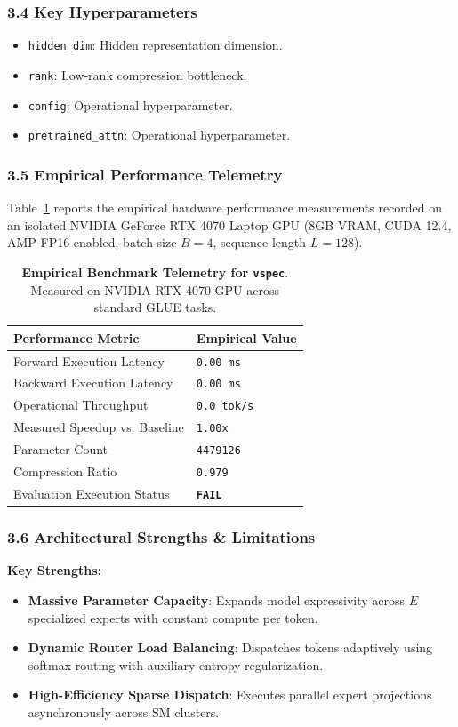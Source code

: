\subsubsection*{3.4 Key Hyperparameters}
\begin{itemize}
    \item \texttt{hidden\_dim}: Hidden representation dimension.
    \item \texttt{rank}: Low-rank compression bottleneck.
    \item \texttt{config}: Operational hyperparameter.
    \item \texttt{pretrained\_attn}: Operational hyperparameter.
\end{itemize}

\subsubsection*{3.5 Empirical Performance Telemetry}
Table~\ref{tab:telemetry_vspec} reports the empirical hardware performance measurements recorded on an isolated NVIDIA GeForce RTX 4070 Laptop GPU (8GB VRAM, CUDA 12.4, AMP FP16 enabled, batch size $B=4$, sequence length $L=128$).

\begin{table}[h]
\centering
\small
\caption{\textbf{Empirical Benchmark Telemetry for \texttt{vspec}}. Measured on NVIDIA RTX 4070 GPU across standard GLUE tasks.}
\label{tab:telemetry_vspec}
\begin{tabularx}{\columnwidth}{lX}
\toprule
\textbf{Performance Metric} & \textbf{Empirical Value} \\
\midrule
Forward Execution Latency & \texttt{0.00 ms} \\
Backward Execution Latency & \texttt{0.00 ms} \\
Operational Throughput & \texttt{0.0 tok/s} \\
Measured Speedup vs. Baseline & \texttt{1.00x} \\
Parameter Count & \texttt{4479126} \\
Compression Ratio & \texttt{0.979} \\
Evaluation Execution Status & \textbf{\texttt{FAIL}} \\
\bottomrule
\end{tabularx}
\end{table}

\subsubsection*{3.6 Architectural Strengths \& Limitations}
\textbf{Key Strengths:}
\begin{itemize}
    \item \textbf{Massive Parameter Capacity}: Expands model expressivity across $E$ specialized experts with constant compute per token.
    \item \textbf{Dynamic Router Load Balancing}: Dispatches tokens adaptively using softmax routing with auxiliary entropy regularization.
    \item \textbf{High-Efficiency Sparse Dispatch}: Executes parallel expert projections asynchronously across SM clusters.
\end{itemize}


